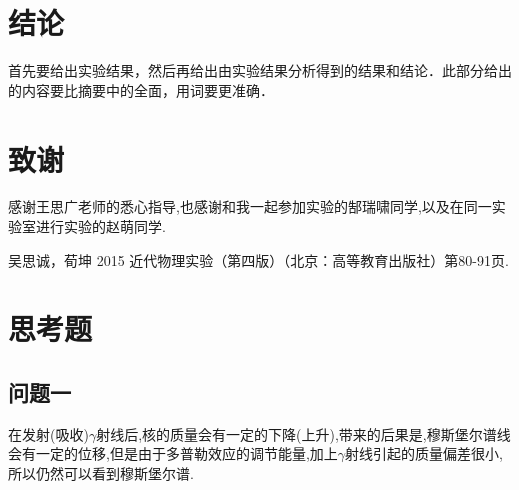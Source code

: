 \documentclass[aps,pre,12pt,preprint,onecolumn,showpacs,showkeys]{revtex4-1}
\begin{document}
\section{结论}
首先要给出实验结果，然后再给出由实验结果分析得到的结果和结论．此部分给出的内容要比摘要中的全面，用词要更准确．\par

\section{致谢}
感谢王思广老师的悉心指导,也感谢和我一起参加实验的郜瑞啸同学,以及在同一实验室进行实验的赵萌同学.
%
\begin{thebibliography}{}
 吴思诚，荀坤 2015 近代物理实验（第四版）（北京：高等教育出版社）第80-91页.

\end{thebibliography}

\clearpage
\appendix
\section{思考题}
\subsection{问题一}
在发射(吸收)$\gamma$射线后,核的质量会有一定的下降(上升),带来的后果是,穆斯堡尔谱线会有一定的位移,但是由于多普勒效应的调节能量,加上$\gamma$射线引起的质量偏差很小,所以仍然可以看到穆斯堡尔谱.
\end{document}
